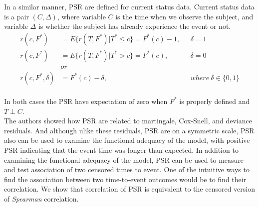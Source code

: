 \documentclass[]{article}
\begin{document}
In a similar manner, PSR are defined for current status data. Current status data is a pair $(C, \Delta)$, where variable $C$ is the time when we observe the subject, and variable $\Delta$ is whether the subject has already experience the event or not. 
	$$
	\begin{aligned}
		r(c, F^*) &= E\{r(T,F^*)|T^*\leq c\} = F^*(c) - 1,~~~&\delta = 1 \\
		r(c, F^*) &= E\{r(T,F^*)|T^*>c\} = F^*(c) ,~~~&\delta = 0 \\
		&or\\
    r(c, F^*, \delta) &= F^*(c) - \delta,~~~&where~\delta \in \{0,1\}\\
	\end{aligned}
	$$

In both cases the PSR have expectation of zero when $F^*$ is properly defined and $T \perp C$.\\

The authors showed how PSR are related to martingale, Cox-Snell, and deviance residuals. And although ulike these residuals, PSR are on a symmetric scale, PSR also can be used to examine the functional adequacy of the model, with positive PSR indicating that the event time was longer than expected. In addition to examining the functional adequacy of the model, PSR can be used to measure and test association of two censored times to event. One of the intuitive ways to find the association between two time-to-event outcomes would be to find their correlation. We show that correlation of PSR is equivalent to the censored version of \emph{Spearman} correlation.
\end{document}
